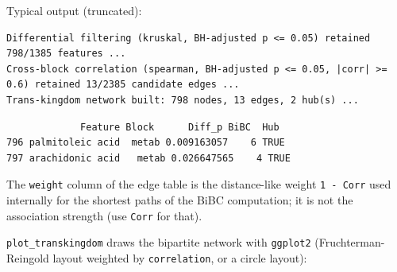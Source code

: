 \documentclass[
]{book}
\newenvironment{Shaded}{\begin{snugshade}}{\end{snugshade}}
\newcommand{\AttributeTok}[1]{\textcolor[rgb]{0.13,0.29,0.53}{#1}}
\newcommand{\CommentTok}[1]{\textcolor[rgb]{0.56,0.35,0.01}{\textit{#1}}}
\newcommand{\FloatTok}[1]{\textcolor[rgb]{0.00,0.00,0.81}{#1}}
\newcommand{\FunctionTok}[1]{\textcolor[rgb]{0.13,0.29,0.53}{\textbf{#1}}}
\newcommand{\NormalTok}[1]{#1}
\newcommand{\SpecialCharTok}[1]{\textcolor[rgb]{0.81,0.36,0.00}{\textbf{#1}}}
\newcommand{\StringTok}[1]{\textcolor[rgb]{0.31,0.60,0.02}{#1}}
\begin{document}
\begin{Shaded}
\end{Shaded}

Typical output (truncated):

\begin{verbatim}
Differential filtering (kruskal, BH-adjusted p <= 0.05) retained 798/1385 features ...
Cross-block correlation (spearman, BH-adjusted p <= 0.05, |corr| >= 0.6) retained 13/2385 candidate edges ...
Trans-kingdom network built: 798 nodes, 13 edges, 2 hub(s) ...
\end{verbatim}

\begin{verbatim}
             Feature Block      Diff_p BiBC  Hub
796 palmitoleic acid  metab 0.009163057    6 TRUE
797 arachidonic acid   metab 0.026647565    4 TRUE
\end{verbatim}

The \texttt{weight} column of the edge table is the distance-like weight \texttt{1\ -\ \textbar{}Corr\textbar{}} used internally for the shortest paths of the BiBC computation; it is not the association strength (use \texttt{Corr} for that).

\texttt{plot\_transkingdom} draws the bipartite network with \texttt{ggplot2} (Fruchterman-Reingold layout weighted by \texttt{\textbar{}correlation\textbar{}}, or a circle layout):

\begin{Shaded}
\end{Shaded}
\end{document}
